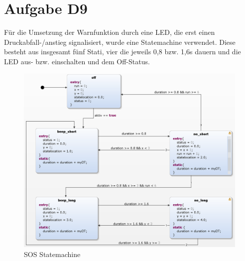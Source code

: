 
\chapter{Aufgabe D9}
Für die Umsetzung der Warnfunktion durch eine LED, die erst einen Druckabfall-/anstieg signalisiert, wurde eine Statemachine verwendet. Diese besteht aus insgesamt fünf Stati, vier die jeweils 0,8 bzw. 1,6s dauern und die LED aus- bzw. einschalten und dem Off-Status.

\begin{figure}[h!]
	\centering
	\includegraphics[width=1\linewidth]{../Graphiken/SOS_state.png}
	\caption{SOS Statemachine}
	\label{fig:SOS_state}
\end{figure}